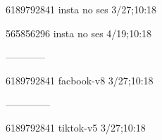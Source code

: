 6189792841 insta no ses
3/27;10:18

565856296 insta no ses
4/19;10:18

------------

6189792841 facbook-v8
3/27;10:18


--------------

6189792841 tiktok-v5
3/27;10:18
